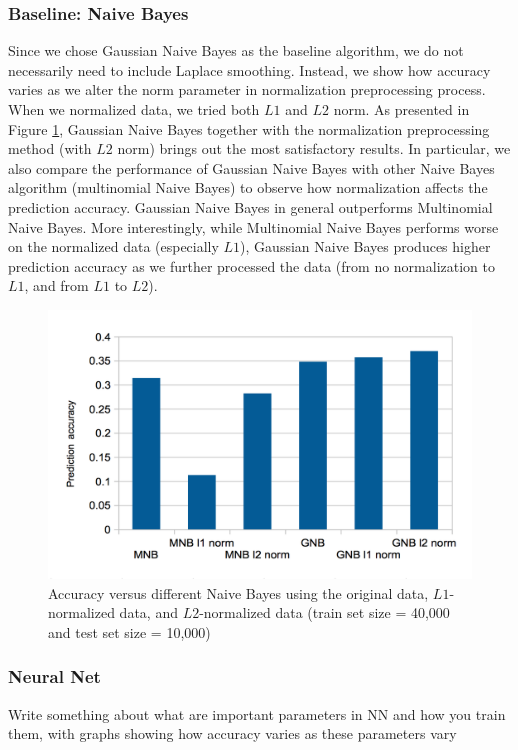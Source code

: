 \documentclass{acm_proc_article-sp}
\begin{document}
\subsubsection{Baseline: Naive Bayes}
Since we chose Gaussian Naive Bayes as the baseline algorithm, we do not necessarily need to include Laplace smoothing. Instead, we show how accuracy varies as we alter the norm parameter in normalization preprocessing process. When we normalized data, we tried both $L1$ and $L2$ norm.  As presented in  Figure \ref{fig:gnbparam}, Gaussian Naive Bayes together with the normalization preprocessing method (with $L2$ norm) brings out the most satisfactory results.   In particular, we also compare the performance of Gaussian Naive Bayes with other Naive Bayes algorithm (multinomial Naive Bayes) to  observe how normalization affects the prediction accuracy. Gaussian Naive Bayes in general outperforms Multinomial Naive Bayes. More interestingly,  while Multinomial Naive Bayes performs worse on the normalized data (especially $L1$),  Gaussian Naive Bayes produces higher prediction accuracy as we further processed the data (from no normalization to $L1$, and from $L1$ to $L2$).
\begin{figure} 
\centering
\includegraphics[width=0.9\columnwidth]{graphs/gnb_param.png}  
\caption{Accuracy versus different Naive Bayes using the original data, $L1$-normalized data, and $L2$-normalized data (train set size = 40,000 and test set size = 10,000)}
\label{fig:gnbparam}
\end{figure}


\subsubsection{Neural Net}
Write something about what are important parameters in NN and how you train them, with graphs showing how accuracy varies as these parameters vary
\end{document}

